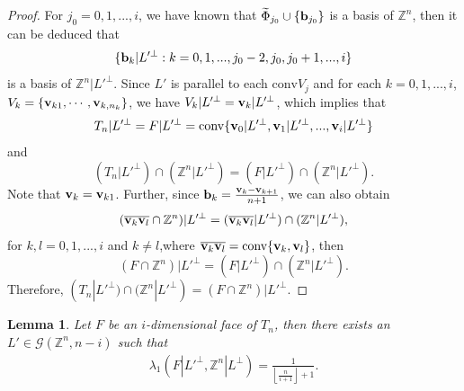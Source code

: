 \documentclass{amsart}
\newtheorem{lemma}[theorem]{Lemma}
\theoremstyle{definition}
\theoremstyle{remark}
\numberwithin{equation}{section}
\begin{document}
\begin{proof}
For $j_0=0,1,...,i$, we have known that $\widetilde{\Phi}_{j_0}\cup\{{\bf b}_{j_0}\}$ is a basis of $\mathbb{Z}^n$, then it can be deduced that $$\{{\bf b}_k|L'^\perp:k=0,1,...,j_0-2,j_0,j_0+1,...,i\}$$ is a basis of $\mathbb{Z}^n|L'^\perp$. Since $L'$ is parallel to each $\mathrm{conv}V_j$ and for each $k=0,1,...,i$, $V_k=\{{\bf v}_{k1},\cdots,{\bf v}_{k,n_k}\}$, we have $V_k|L'^\perp={\bf v}_k|L'^\perp$, which implies that
$$T_n|L'^\perp=F|L'^\perp=\mathrm{conv}\{{\bf v}_0|L'^\perp, {\bf v}_1|L'^\perp, ..., {\bf v}_i|L'^\perp\}$$
and
$$(T_n|L'^\perp)\cap(\mathbb{Z}^n|L'^\perp)=(F|L'^\perp)\cap(\mathbb{Z}^n|L'^\perp).$$ Note that ${\bf v}_k={\bf v}_{k1}$. Further, since ${\bf b}_k=\frac{{\bf v}_k-{\bf v}_{k+1}}{n+1}$, we can also obtain
$$(\overline{{\bf v}_k{\bf v}_l}\cap\mathbb{Z}^n)|L'^\perp=(\overline{{\bf v}_k{\bf v}_l}|L'^\perp)\cap(\mathbb{Z}^n|L'^\perp),$$
for $k,l=0,1,...,i$ and $k\not=l$,where $\overline{{\bf v}_k{\bf v}_l}=\text{conv}\{{\bf v}_k,{\bf v}_l\}$, then
$$(F\cap\mathbb{Z}^n)|L'^\perp=(F|L'^\perp)\cap(\mathbb{Z}^n|L'^\perp).$$ 
Therefore,  $(T_n|L'^\perp)\cap(\mathbb{Z}^n|L'^\perp)=(F\cap\mathbb{Z}^n)|L'^\perp$.



\end{proof}


\begin{lemma}\label{lem:lowTnZn}
    Let $F$ be an $i$-dimensional face of $T_n$, then there exists an $L'\in\mathcal{G}(\mathbb{Z}^n,n-i)$ such that
    \begin{align*}
       \lambda_1(F|L'^\perp,\mathbb{Z}^n|L^\perp)=\frac{1}{\left\lfloor\frac{n}{i+1}\right\rfloor+1}.
    \end{align*}
\end{lemma}
\end{document}
